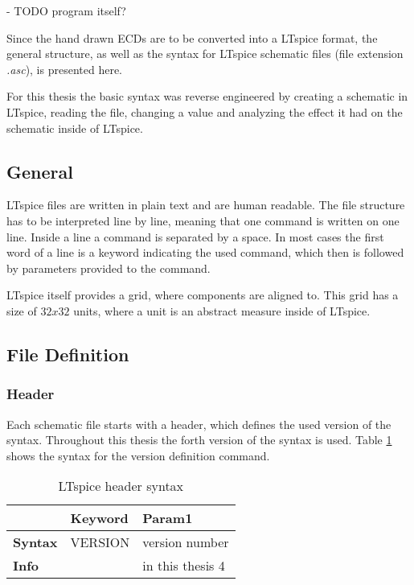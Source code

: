 - TODO program itself?

Since the hand drawn \acp{ECD} are to be converted into a LTspice format, the general structure, as well as the syntax for LTspice schematic files (file extension \textit{.asc}), is presented here.

For this thesis the basic syntax was reverse engineered by creating a schematic in LTspice, reading the file, changing a value and analyzing the effect it had on the schematic inside of LTspice.

\subsection{General}
LTspice files are written in plain text and are human readable.
The file structure has to be interpreted line by line, meaning that one command is written on one line.
Inside a line a command is separated by a space.
In most cases the first word of a line is a keyword indicating the used command, which then is followed by parameters provided to the command.

LTspice itself provides a grid, where components are aligned to.
This grid has a size of $32x32$ units, where a unit is an abstract measure inside of LTspice.

\subsection{File Definition}

\subsubsection{Header}

Each schematic file starts with a header, which defines the used version of the syntax.
Throughout this thesis the forth version of the syntax is used. Table \ref{tab:ltheader_syntax} shows the syntax for the version definition command.

\begin{table}[H]
\begin{center}

\begin{tabular}{l|l|l}
    & \textbf{Keyword} & \textbf{Param1}\\
    \hline
    \textbf{Syntax} & VERSION & version number\\
    \textbf{Info} & & in this thesis 4
\end{tabular}
\caption{LTspice header syntax}
\label{tab:ltheader_syntax}

\end{center}
\end{table}


